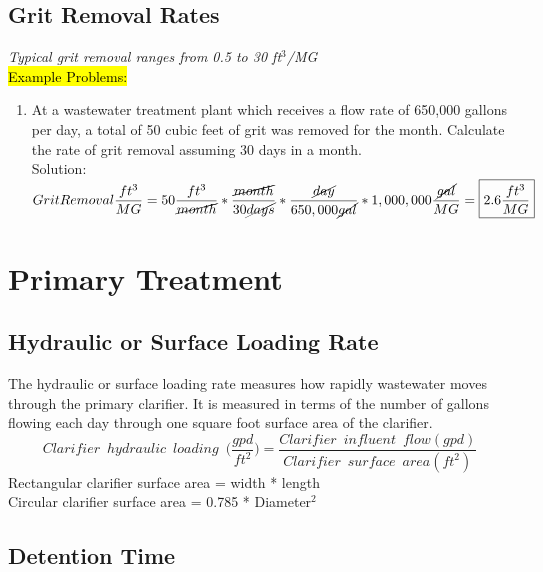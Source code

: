 \subsection{Grit Removal Rates}
\emph{Typical grit removal ranges from 0.5 to 30 ft$^3$/MG}\\
\vspace{0.3cm}
\hl{Example Problems:}\\
\begin{enumerate}[1.]
\item At a wastewater treatment plant which receives a flow rate of 650,000 gallons per day, a total of 50 cubic feet of grit was removed for the month. Calculate the rate of grit removal assuming 30 days in a month.\\
Solution:\\
$Grit Removal\dfrac{ft^3}{MG}=50\dfrac{ft^3}{ \cancel{month}}*\dfrac{\cancel{month}}{30\cancel{days}}*\dfrac{\cancel{day}}{650,000\cancel{gal}}*1,000,000\dfrac{\cancel{gal}}{MG}=\boxed{2.6\dfrac{ft^3}{MG}}$
\end{enumerate}

\section{Primary Treatment} 
\subsection{Hydraulic or Surface Loading Rate}

The hydraulic or surface loading rate measures how rapidly wastewater moves through the primary clarifier.  It is measured in terms of the number of gallons flowing each day through one square foot surface area of the clarifier. 
$$Clarifier \enspace hydraulic \enspace loading \enspace 	\Big(\dfrac{gpd}{ft^2}\Big) =\dfrac{Clarifier \enspace influent 	\enspace flow (gpd)}{Clarifier \enspace surface \enspace area 	(ft^2)}$$ 
		Rectangular clarifier surface area  = width * length\\
		Circular clarifier surface area  = 0.785 * Diameter$^2 $\\
\subsection{Detention Time}

